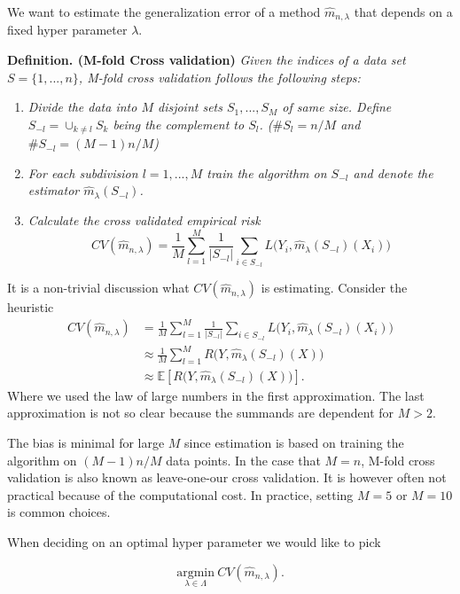 \documentclass[a4paper,12pt,openany]{book}
\providecommand{\tightlist}{%
 \setlength{\itemsep}{0pt}\setlength{\parskip}{0pt}}
\begin{document}
We want to estimate the generalization error of a method \(\hat{m}_{n,\lambda}\) that depends on a fixed hyper parameter \(\lambda\).

\textbf{Definition. (M-fold Cross validation)} \emph{Given the indices of a data set \(S=\{1,...,n\}\), M-fold cross validation follows the following steps:}

\begin{enumerate}
\def\labelenumi{\arabic{enumi}.}
\tightlist
\item
  \emph{Divide the data into \(M\) disjoint sets \(S_1,...,S_M\) of same size. Define \(S_{-l}=\cup_{k\ne l}S_k\) being the complement to \(S_l\). (\(\#S_l=n/M\) and \(\#S_{-l}=(M-1)n/M\))}
\item
  \emph{For each subdivision \(l=1,...,M\) train the algorithm on \(S_{-l}\) and denote the estimator \(\hat{m}_\lambda(S_{-l})\).}
\item
  \emph{Calculate the cross validated empirical risk}
  \[
    CV(\hat{m}_{n,\lambda})=\frac{1}{M}\sum_{l=1}^M\frac{1}{\vert S_{-l}\vert}\sum_{i\in S_{-l}}L\big(Y_i,\hat{m}_\lambda(S_{-l})(X_i)\big)
    \]
\end{enumerate}

It is a non-trivial discussion what \(CV(\hat{m}_{n,\lambda})\) is estimating. Consider the heuristic
\begin{align*}
CV(\hat{m}_{n,\lambda})&=\frac{1}{M}\sum_{l=1}^M\frac{1}{\vert S_{-l}\vert}\sum_{i\in S_{-l}}L\big(Y_i,\hat{m}_\lambda(S_{-l})(X_i)\big)\\
&\approx \frac{1}{M}\sum_{l=1}^MR\big(Y,\hat{m}_\lambda(S_{-l})(X)\big)\\
&\approx \mathbb{E}\left[R\big(Y,\hat{m}_\lambda(S_{-l})(X)\big)\right].
\end{align*}
Where we used the law of large numbers in the first approximation. The last approximation is not so clear because the summands are dependent for \(M>2\).

The bias is minimal for large \(M\) since estimation is based on training the algorithm on \((M-1)n/M\) data points. In the case that \(M=n\), M-fold cross validation is also known as leave-one-our cross validation. It is however often not practical because of the computational cost. In practice, setting \(M=5\) or \(M=10\) is common choices.

When deciding on an optimal hyper parameter we would like to pick

\[
\underset{\lambda \in \Lambda}{\text{argmin}}\ CV(\hat{m}_{n,\lambda}).
\]
\end{document}
